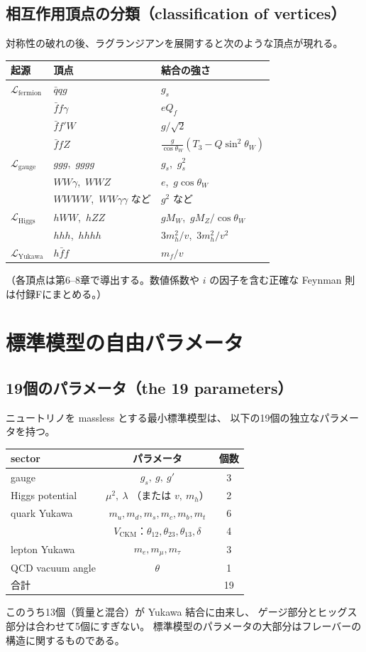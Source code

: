 \documentclass[uplatex,dvipdfmx,a4paper,11pt,openany]{jsbook}
\numberwithin{equation}{chapter}
\theoremstyle{definition}
\theoremstyle{plain}
\theoremstyle{remark}
\newcommand{\Lag}{\mathcal{L}}
\begin{document}
\subsection{相互作用頂点の分類（classification of vertices）}
対称性の破れの後、ラグランジアンを展開すると次のような頂点が現れる。
\begin{center}
\renewcommand{\arraystretch}{1.3}
\begin{tabular}{lll}
\toprule
起源 & 頂点 & 結合の強さ\\
\midrule
$\Lag_{\mathrm{fermion}}$ & $\bar qqg$ & $g_s$\\
 & $\bar ff\gamma$ & $eQ_f$\\
 & $\bar f f'W$ & $g/\sqrt2$\\
 & $\bar ffZ$ & $\frac{g}{\cos\theta_W}(T_3-Q\sin^2\theta_W)$\\
$\Lag_{\mathrm{gauge}}$ & $ggg$,\ $gggg$ & $g_s$,\ $g_s^2$\\
 & $WW\gamma$,\ $WWZ$ & $e$,\ $g\cos\theta_W$\\
 & $WWWW$,\ $WW\gamma\gamma$ など & $g^2$ など\\
$\Lag_{\mathrm{Higgs}}$ & $hWW$,\ $hZZ$ & $gM_W$,\ $gM_Z/\cos\theta_W$\\
 & $hhh$,\ $hhhh$ & $3m_h^2/v$,\ $3m_h^2/v^2$\\
$\Lag_{\mathrm{Yukawa}}$ & $h\bar ff$ & $m_f/v$\\
\bottomrule
\end{tabular}
\end{center}
（各頂点は第6--8章で導出する。数値係数や $i$ の因子を含む正確な Feynman 則は付録Fにまとめる。）
\section{標準模型の自由パラメータ}
\label{sec:SM-parameters}
\subsection{19個のパラメータ（the 19 parameters）}
ニュートリノを massless とする最小標準模型は、
以下の19個の独立なパラメータを持つ。
\begin{center}
\renewcommand{\arraystretch}{1.3}
\begin{tabular}{lcc}
\toprule
sector & パラメータ & 個数\\
\midrule
gauge & $g_s,\ g,\ g'$ & 3\\
Higgs potential & $\mu^2,\ \lambda$ \quad（または $v,\ m_h$） & 2\\
quark Yukawa & $m_u,m_d,m_s,m_c,m_b,m_t$ & 6\\
 & $V_{\mathrm{CKM}}$：$\theta_{12},\theta_{23},\theta_{13},\delta$ & 4\\
lepton Yukawa & $m_e,m_\mu,m_\tau$ & 3\\
QCD vacuum angle & $\theta$ & 1\\
\midrule
合計 & & 19\\
\bottomrule
\end{tabular}
\end{center}
このうち13個（質量と混合）が Yukawa 結合に由来し、
ゲージ部分とヒッグス部分は合わせて5個にすぎない。
標準模型のパラメータの大部分はフレーバーの構造に関するものである。
\end{document}
